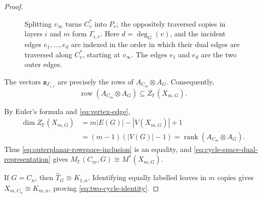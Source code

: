 \documentclass[12pt,a4paper]{article}
\numberwithin{equation}{section}
\DeclareMathOperator{\rank}{rank}
\DeclareMathOperator{\row}{row}
\newcommand{\F}{\mathbb F}
\theoremstyle{definition}
\theoremstyle{remark}
\begin{document}
\begin{proof}
\begin{figure}[!ht]
\caption{Splitting \(v_\infty\) turns \(C_v^*\) into \(P_v\);
the oppositely traversed copies in layers \(i\) and \(m\) form
\(\Gamma_{i,v}\).  Here \(d=\deg_G(v)\), and the incident edges
\(e_1,\ldots,e_d\) are indexed in the order in which their dual
edges are traversed along \(C_v^*\), starting at \(v_\infty\).
The edges \(e_1\) and \(e_d\) are the two outer edges.}
\label{fig:dual-path-cycle}
\end{figure}
The vectors \(\boldsymbol z_{\Gamma_{i,v}}\) are precisely the rows of \(A_{C_m}\otimes A_G\).  Consequently,
\begin{equation}\label{eq:outerplanar-rowspace-inclusion}
 \row(A_{C_m}\otimes A_G)\subseteq Z_{\F}(X_{m,G}).
\end{equation}

By Euler's formula and \eqref{eq:vertex-edge},
\[
 \begin{aligned}
 \dim Z_{\F}(X_{m,G})
 &=m|E(G)|-|V(X_{m,G})|+1\\
 &=(m-1)(|V(G)|-1)
 =\rank(A_{C_m}\otimes A_G).
 \end{aligned}
\]
Thus \eqref{eq:outerplanar-rowspace-inclusion} is an equality, and
\eqref{eq:cycle-space-dual-representation} gives
\(M_{\F}(C_m,G)\cong M^*(X_{m,G})\).

If \(G=C_n\), then \(\widehat T_G\cong K_{1,n}\).
Identifying equally labelled leaves in \(m\) copies gives
\(X_{m,C_n}\cong K_{m,n}\), proving
\eqref{eq:two-cycle-identity}.
\end{proof}
\end{document}
